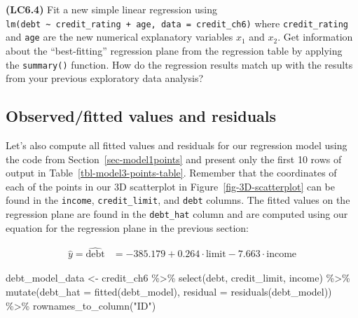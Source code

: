 \documentclass[
  letterpaper,
  DIV=11,
  numbers=noendperiod]{scrreprt}
\newenvironment{Shaded}{\begin{snugshade}}{\end{snugshade}}
\newcommand{\AttributeTok}[1]{\textcolor[rgb]{0.40,0.45,0.13}{#1}}
\newcommand{\FunctionTok}[1]{\textcolor[rgb]{0.28,0.35,0.67}{#1}}
\newcommand{\NormalTok}[1]{\textcolor[rgb]{0.00,0.23,0.31}{#1}}
\newcommand{\OtherTok}[1]{\textcolor[rgb]{0.00,0.23,0.31}{#1}}
\newcommand{\SpecialCharTok}[1]{\textcolor[rgb]{0.37,0.37,0.37}{#1}}
\newcommand{\StringTok}[1]{\textcolor[rgb]{0.13,0.47,0.30}{#1}}
\theoremstyle{definition}
\theoremstyle{remark}
\begin{document}
\begin{tcolorbox}[enhanced jigsaw, coltitle=black, toprule=.15mm, bottomtitle=1mm, breakable, leftrule=.75mm, title={{🎯} Learning Check 6.3}, opacitybacktitle=0.6, colback=white, rightrule=.15mm, opacityback=0, toptitle=1mm, colbacktitle=quarto-callout-tip-color!10!white, colframe=quarto-callout-tip-color-frame, titlerule=0mm, arc=.35mm, bottomrule=.15mm, left=2mm]
\textbf{(LC6.4)} Fit a new simple linear regression using
\texttt{lm(debt\ \textasciitilde{}\ credit\_rating\ +\ age,\ data\ =\ credit\_ch6)}
where \texttt{credit\_rating} and \texttt{age} are the new numerical
explanatory variables \(x_1\) and \(x_2\). Get information about the
``best-fitting'' regression plane from the regression table by applying
the \texttt{summary()} function. How do the regression results match up
with the results from your previous exploratory data analysis?
\end{tcolorbox}

\hypertarget{sec-model3points}{%
\subsection{Observed/fitted values and
residuals}\label{sec-model3points}}

Let's also compute all fitted values and residuals for our regression
model using the code from Section~\ref{sec-model1points} and present
only the first 10 rows of output in Table~\ref{tbl-model3-points-table}.
Remember that the coordinates of each of the points in our 3D
scatterplot in Figure~\ref{fig-3D-scatterplot} can be found in the
\texttt{income}, \texttt{credit\_limit}, and \texttt{debt} columns. The
fitted values on the regression plane are found in the
\texttt{debt\_hat} column and are computed using our equation for the
regression plane in the previous section:

\[
\begin{aligned}
\widehat{y} = \widehat{\text{debt}} &= -385.179 + 0.264 \cdot \text{limit} - 7.663 \cdot \text{income}
\end{aligned}
\]

\begin{Shaded}
\begin{Highlighting}[]
\NormalTok{debt\_model\_data }\OtherTok{\textless{}{-}}\NormalTok{ credit\_ch6 }\SpecialCharTok{\%\textgreater{}\%} 
  \FunctionTok{select}\NormalTok{(debt, credit\_limit, income) }\SpecialCharTok{\%\textgreater{}\%} 
  \FunctionTok{mutate}\NormalTok{(}\AttributeTok{debt\_hat =} \FunctionTok{fitted}\NormalTok{(debt\_model),}
         \AttributeTok{residual =} \FunctionTok{residuals}\NormalTok{(debt\_model)) }\SpecialCharTok{\%\textgreater{}\%} 
  \FunctionTok{rownames\_to\_column}\NormalTok{(}\StringTok{"ID"}\NormalTok{)}
\end{Highlighting}
\end{Shaded}
\end{document}
